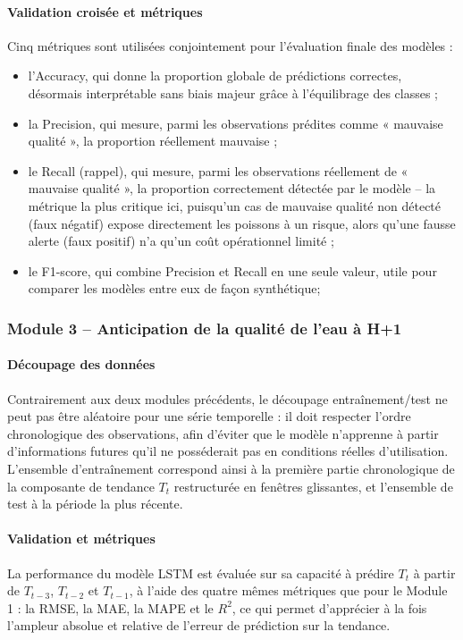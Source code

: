 \documentclass[a4paper,12pt, oneside]{article}
\begin{document}
\paragraph{Validation croisée et métriques\\}
Cinq métriques sont utilisées conjointement pour l'évaluation finale des modèles :
\begin{itemize}
    \item l'Accuracy, qui donne la proportion globale de prédictions correctes, désormais interprétable sans biais majeur grâce à l'équilibrage des classes ;
    \item la Precision, qui mesure, parmi les observations prédites comme « mauvaise qualité », la proportion réellement mauvaise ;
    \item le Recall (rappel), qui mesure, parmi les observations réellement de « mauvaise qualité », la proportion correctement détectée par le modèle -- la métrique la plus critique ici, puisqu'un cas de mauvaise qualité non détecté (faux négatif) expose directement les poissons à un risque, alors qu'une fausse alerte (faux positif) n'a qu'un coût opérationnel limité ;
    \item le F1-score, qui combine Precision et Recall en une seule valeur, utile pour comparer les modèles entre eux de façon synthétique;
\end{itemize}

\subsubsection[Anticipation de la qualité de l'eau à H+1]{Module 3 -- Anticipation de la qualité de l'eau à H+1\\}

\paragraph{Découpage des données\\}
Contrairement aux deux modules précédents, le découpage entraînement/test ne peut pas être aléatoire pour une série temporelle : il doit respecter l'ordre chronologique des observations, afin d'éviter que le modèle n'apprenne à partir d'informations futures qu'il ne posséderait pas en conditions réelles d'utilisation. L'ensemble d'entraînement correspond ainsi à la première partie chronologique de la composante de tendance $T_t$ restructurée en fenêtres glissantes, et l'ensemble de test à la période la plus récente.

\paragraph{Validation et métriques\\}
La performance du modèle LSTM est évaluée sur sa capacité à prédire $T_t$ à partir de $T_{t-3}$, $T_{t-2}$ et $T_{t-1}$, à l'aide des quatre mêmes métriques que pour le Module 1 : la RMSE, la MAE, la MAPE et le $R^2$, ce qui permet d'apprécier à la fois l'ampleur absolue et relative de l'erreur de prédiction sur la tendance.
\end{document}
